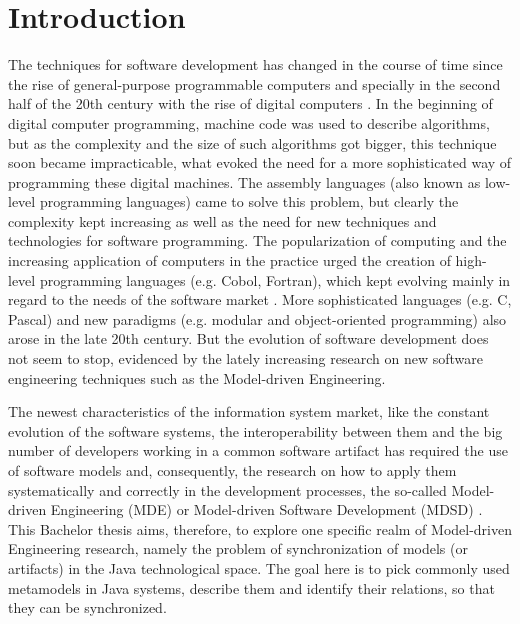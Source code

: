 \documentclass[tuberlin,cic,tc,english,noabntcite]{iiufrgs}
\begin{document}

\tableofcontents

\chapter{Introduction}
The techniques for software development has changed in the course of time since the rise of general-purpose programmable computers and specially in the second half of the 20th century with the rise of digital computers \citep{ceruzzi2003history}. In the beginning of digital computer programming, machine code was used to describe algorithms, but as the complexity and the size of such algorithms got bigger, this technique soon became impracticable, what evoked the need for a more sophisticated way of programming these digital machines. The assembly languages (also known as low-level programming languages) came to solve this problem, but clearly the complexity kept increasing as well as the need for new techniques and technologies for software programming. The popularization of computing and the increasing application of computers in the practice urged the creation of high-level programming languages (e.g. Cobol, Fortran), which kept evolving mainly in regard to the needs of the software market \citep{ceruzzi2003history}. More sophisticated languages (e.g. C, Pascal) and new paradigms (e.g. modular and object-oriented programming) also arose in the late 20th century. But the evolution of software development does not seem to stop, evidenced by the lately increasing research on new software engineering techniques such as the Model-driven Engineering.

The newest characteristics of the information system market, like the constant evolution of the software systems, the interoperability between them and the big number of developers working in a common software artifact has required the use of software models and, consequently, the research on how to apply them systematically and correctly in the development processes, the so-called Model-driven Engineering (MDE) or Model-driven Software Development (MDSD) \citep{france2007model}. This Bachelor thesis aims, therefore, to explore one specific realm of Model-driven Engineering research, namely the problem of synchronization of models (or artifacts) in the Java technological space. The goal here is to pick commonly used metamodels in Java systems, describe them and identify their relations, so that they can be synchronized.
\end{document}
